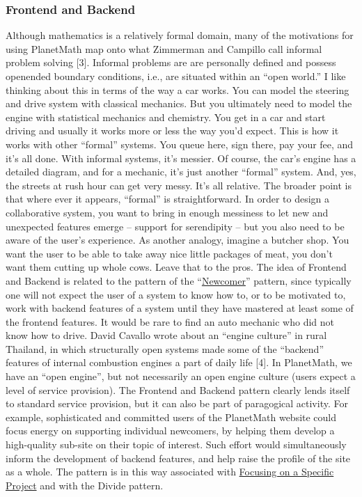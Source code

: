 \subsubsection{Frontend and Backend}

Although mathematics is a relatively formal domain, many of the
motivations for using PlanetMath map onto what Zimmerman and Campillo
call informal problem solving {[}3{]}. Informal problems are are
personally defined and possess openended boundary conditions, i.e., are
situated within an ``open world.'' I like thinking about this in terms
of the way a car works. You can model the steering and drive system with
classical mechanics. But you ultimately need to model the engine with
statistical mechanics and chemistry. You get in a car and start driving
and usually it works more or less the way you'd expect. This is how it
works with other ``formal'' systems. You queue here, sign there, pay
your fee, and it's all done. With informal systems, it's messier. Of
course, the car's engine has a detailed diagram, and for a mechanic,
it's just another ``formal'' system. And, yes, the streets at rush hour
can get very messy. It's all relative. The broader point is that where
ever it appears, ``formal'' is straightforward. In order to design a
collaborative system, you want to bring in enough messiness to let new
and unexpected features emerge -- support for serendipity -- but you
also need to be aware of the user's experience. As another analogy,
imagine a butcher shop. You want the user to be able to take away nice
little packages of meat, you don't want them cutting up whole cows.
Leave that to the pros. The idea of Frontend and Backend is related to
the pattern of the
``\href{http://peeragogy.org/practice/newcomer/}{Newcomer}'' pattern,
since typically one will not expect the user of a system to know how to,
or to be motivated to, work with backend features of a system until they
have mastered at least some of the frontend features. It would be rare
to find an auto mechanic who did not know how to drive. David Cavallo
wrote about an ``engine culture'' in rural Thailand, in which
structurally open systems made some of the ``backend'' features of
internal combustion engines a part of daily life {[}4{]}. In PlanetMath,
we have an ``open engine'', but not necessarily an open engine culture
(users expect a level of service provision). The Frontend and Backend
pattern clearly lends itself to standard service provision, but it can
also be part of paragogical activity. For example, sophisticated and
committed users of the PlanetMath website could focus energy on
supporting individual newcomers, by helping them develop a high-quality
sub-site on their topic of interest. Such effort would simultaneously
inform the development of backend features, and help raise the profile
of the site as a whole. The pattern is in this way associated with
\href{http://peeragogy.org/practice/focusing-on-a-specific-project/}{Focusing
on a Specific Project} and with the Divide pattern.

